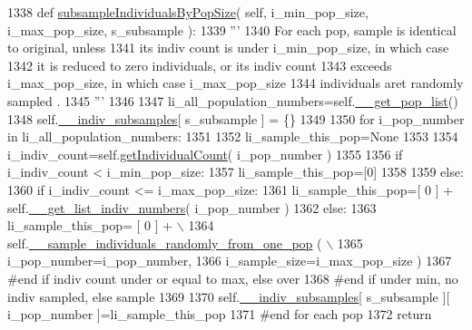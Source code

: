 \begin{DoxyCode}
1338     \textcolor{keyword}{def }\hyperlink{classnegui_1_1genepopfilemanager_1_1GenepopFileManager_afdad8528d7b19a8b2eeca447bb95a5a0}{subsampleIndividualsByPopSize}( self, i\_min\_pop\_size, i\_max\_pop\_size, 
      s\_subsample ):
1339         \textcolor{stringliteral}{'''}
1340 \textcolor{stringliteral}{        For each pop, sample is identical to original, unless }
1341 \textcolor{stringliteral}{        its indiv count is under i\_min\_pop\_size, in which case}
1342 \textcolor{stringliteral}{        it is reduced to zero individuals, or its indiv count}
1343 \textcolor{stringliteral}{        exceeds i\_max\_pop\_size, in which case i\_max\_pop\_size }
1344 \textcolor{stringliteral}{        individuals aret randomly sampled .}
1345 \textcolor{stringliteral}{        '''}
1346 
1347         li\_all\_population\_numbers=self.\hyperlink{classnegui_1_1genepopfilemanager_1_1GenepopFileManager_a0cd3178624c652968b4d319f12e5df6e}{\_\_get\_pop\_list}()
1348         self.\hyperlink{classnegui_1_1genepopfilemanager_1_1GenepopFileManager_a1e8379bcee4902ca9314ff53fcb71644}{\_\_indiv\_subsamples}[ s\_subsample ] = \{\}
1349 
1350         \textcolor{keywordflow}{for} i\_pop\_number \textcolor{keywordflow}{in} li\_all\_population\_numbers:
1351 
1352             li\_sample\_this\_pop=\textcolor{keywordtype}{None}
1353 
1354             i\_indiv\_count=self.\hyperlink{classnegui_1_1genepopfilemanager_1_1GenepopFileManager_a05e723069f5129b21a4d017c2a5317b0}{getIndividualCount}( i\_pop\_number )
1355 
1356             \textcolor{keywordflow}{if} i\_indiv\_count < i\_min\_pop\_size:
1357                 li\_sample\_this\_pop=[0]
1358 
1359             \textcolor{keywordflow}{else}:               
1360                 \textcolor{keywordflow}{if} i\_indiv\_count <= i\_max\_pop\_size:
1361                     li\_sample\_this\_pop=[ 0 ] + self.\hyperlink{classnegui_1_1genepopfilemanager_1_1GenepopFileManager_a4615769e9db90aa477aa3fd865408f54}{\_\_get\_list\_indiv\_numbers}( 
      i\_pop\_number )
1362                 \textcolor{keywordflow}{else}:
1363                     li\_sample\_this\_pop= [ 0 ] + \(\backslash\)
1364                             self.\hyperlink{classnegui_1_1genepopfilemanager_1_1GenepopFileManager_a9818467c9cb40f8e1de0c6cc7f52e263}{\_\_sample\_individuals\_randomly\_from\_one\_pop}
      ( \(\backslash\)
1365                                                                  i\_pop\_number=i\_pop\_number,
1366                                                                  i\_sample\_size=i\_max\_pop\_size )
1367                 \textcolor{comment}{#end if indiv count under or equal to max, else over}
1368             \textcolor{comment}{#end if under min, no indiv sampled, else sample}
1369 
1370             self.\hyperlink{classnegui_1_1genepopfilemanager_1_1GenepopFileManager_a1e8379bcee4902ca9314ff53fcb71644}{\_\_indiv\_subsamples}[ s\_subsample ][ i\_pop\_number ]=li\_sample\_this\_pop
1371         \textcolor{comment}{#end for each pop}
1372         \textcolor{keywordflow}{return}
\end{DoxyCode}

